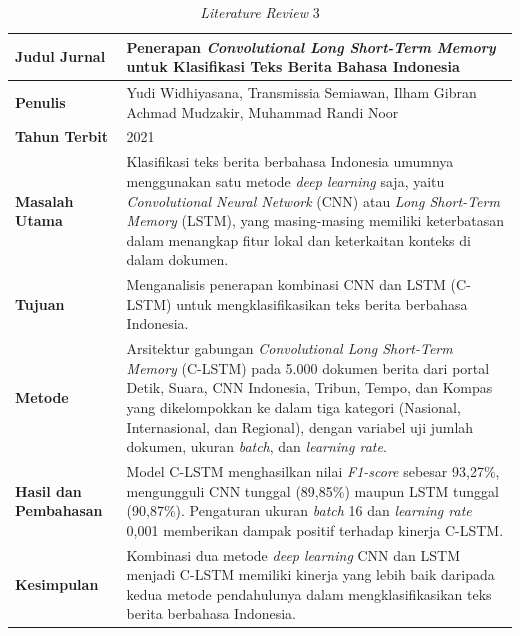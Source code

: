 \documentclass[12pt,a4paper,twoside]{report}
\begin{document}
\clearpage
\begin{table}[H]
  \centering
  \caption{\textit{Literature Review} 3}
  \label{tab:sota3}
  \begin{spacing}{1.15}
  \normalsize
  \begin{tabular}{|L{119.5pt}|L{251.5pt}|}
    \hline
    \textbf{Judul Jurnal} & Penerapan \textit{Convolutional Long Short-Term Memory} untuk Klasifikasi Teks Berita Bahasa Indonesia \\ \hline
    \textbf{Penulis} & Yudi Widhiyasana, Transmissia Semiawan, Ilham Gibran Achmad Mudzakir, Muhammad Randi Noor \\ \hline
    \textbf{Tahun Terbit} & 2021 \\ \hline
    \textbf{Masalah Utama} & Klasifikasi teks berita berbahasa Indonesia umumnya menggunakan satu metode \textit{deep learning} saja, yaitu \textit{Convolutional Neural Network} (CNN) atau \textit{Long Short-Term Memory} (LSTM), yang masing-masing memiliki keterbatasan dalam menangkap fitur lokal dan keterkaitan konteks di dalam dokumen. \\ \hline
    \textbf{Tujuan} & Menganalisis penerapan kombinasi CNN dan LSTM (C-LSTM) untuk mengklasifikasikan teks berita berbahasa Indonesia. \\ \hline
    \textbf{Metode} & Arsitektur gabungan \textit{Convolutional Long Short-Term Memory} (C-LSTM) pada 5.000 dokumen berita dari portal Detik, Suara, CNN Indonesia, Tribun, Tempo, dan Kompas yang dikelompokkan ke dalam tiga kategori (Nasional, Internasional, dan Regional), dengan variabel uji jumlah dokumen, ukuran \textit{batch}, dan \textit{learning rate}. \\ \hline
    \textbf{Hasil dan Pembahasan} & Model C-LSTM menghasilkan nilai \textit{F1-score} sebesar 93,27\%, mengungguli CNN tunggal (89,85\%) maupun LSTM tunggal (90,87\%). Pengaturan ukuran \textit{batch} 16 dan \textit{learning rate} 0,001 memberikan dampak positif terhadap kinerja C-LSTM. \\ \hline
    \textbf{Kesimpulan} & Kombinasi dua metode \textit{deep learning} CNN dan LSTM menjadi C-LSTM memiliki kinerja yang lebih baik daripada kedua metode pendahulunya dalam mengklasifikasikan teks berita berbahasa Indonesia. \\ \hline
  \end{tabular}
  \end{spacing}
\end{table}
\end{document}
